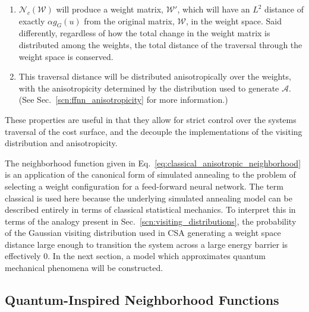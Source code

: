 \documentclass[11pt]{afthesis}
\begin{document}
	\begin{enumerate}
		\item $\mathcal{N}_{c} (\boldsymbol{\mathcal{W}})$ will produce a weight matrix, $\boldsymbol{\mathcal{W}'}$, which will have an $L^2$ distance of exactly $\alpha g_{G}(u)$ from the original matrix, $\boldsymbol{\mathcal{W}}$, in the weight space. Said differently, regardless of how the total change in the weight matrix is distributed among the weights, the total distance of the traversal through the weight space is conserved.
		\item This traversal distance will be distributed anisotropically over the weights, with the anisotropicity determined by the distribution used to generate $\boldsymbol{\mathcal{A}}$. (See Sec.~\ref{scn:ffnn_anisotropicity} for more information.)
	\end{enumerate}
	These properties are useful in that they allow for strict control over the systems traversal of the cost surface, and the decouple the implementations of the visiting distribution and anisotropicity.
	
	The neighborhood function given in Eq.~\ref{eq:classical_anisotropic_neighborhood} is an application of the canonical form of simulated annealing to the problem of selecting a weight configuration for a feed-forward neural network. The term classical is used here because the underlying simulated annealing model can be described entirely in terms of classical statistical mechanics. To interpret this in terms of the analogy present in Sec.~\ref{scn:visiting_distributions}, the probability of the Gaussian visiting distribution used in CSA generating a weight space distance large enough to transition the system across a large energy barrier is effectively $0$. In the next section, a model which approximates quantum mechanical phenomena will be constructed.
	
	\subsection{Quantum-Inspired Neighborhood Functions}
	\label{scn:quantum_neighborhood}
	
\end{document}
